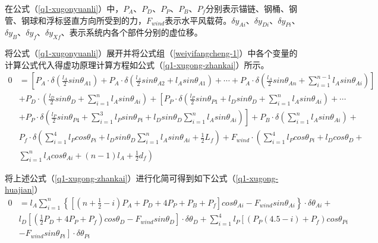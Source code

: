 \documentclass[withoutpreface,bwprint]{cumcmthesis} %
\begin{document}
\par 在公式（\ref{q1-xugonyuanli}）中，$P_A$、$P_D$、$P_P$、$P_B$、$P_f$分别表示锚链、钢桶、钢管、钢球和浮标竖直方向所受到的力，$F_{wind}$表示水平风载荷。$\delta y_{Ai}$、$\delta y_{Di}$、$\delta y_{Pi}$、$\delta y_{B}$、$\delta y_{f}$、$\delta y_{Xf}$、表示系统内各个部件分别的虚位移。
\par 将公式（\ref{q1-xugonyuanli}）展开并将公式组（\ref{weiyifangcheng-1}）中各个变量的计算公式代入得虚功原理计算方程如公式（\ref{q1-xugong-zhankai}）所示。
\begin{equation}
	\label{q1-xugong-zhankai}
	\begin{split}
		0 &= \left[ P_A \cdot \delta(\frac{l_A}{2}sin \theta_{A1}) + P_A \cdot \delta(\frac{l_A}{2}sin \theta_{A2} + l_A sin \theta_{A1}) + \cdots +P_A \cdot \delta(\frac{l_A}{2}sin \theta_{An} + \sum\limits_{i=1}^{n-1} l_A sin \theta_{Ai}) \right] \\ 
		& + P_D \cdot (\frac{l_D}{2}sin \theta_{D} + \sum\limits_{i=1}^{n}l_A sin \theta_{Ai}) + \left[ {P_P \cdot \delta(\frac{l_P}{2}sin \theta_{P1} + l_D sin \theta_D + \sum\limits_{i=1}^{n}l_A sin\theta_{Ai} ) + \cdots} \right. \\
		& \left. {+ P_P \cdot \delta(\frac{l_P}{2}sin \theta_{P4} + \sum\limits_{i=1}^{3} l_P sin \theta_{Pi} +l_D sin \theta_D \sum\limits_{i=1}^{n}l_A sin\theta_{Ai} )} \right] + P_B \cdot \delta (\sum\limits_{i=1}^{n} l_A sin \theta_{Ai}) + \\
		& P_f \cdot \delta (\sum\limits_{i=1}^{4}l_P cos\theta_{Pi} + l_D sin \theta_{D} \sum\limits_{i=1}^{n}l_A sin \theta_{Ai} + \frac{1}{2}L_f) + F_{wind} \cdot \left({\sum\limits_{i=1}^{4}l_P cos \theta_{Pi} + l_D cos \theta_D +} \right. \\
		& \left. {\sum\limits_{i=1}^{n}l_A cos \theta_{Ai} + (n-1)l_A + \frac{1}{2} d_f} \right)
	\end{split}
\end{equation}
\par 将上述公式（\ref{q1-xugong-zhankai}）进行化简可得到如下公式（\ref{q1-xugong-huajian}）
\begin{equation}
	\label{q1-xugong-huajian}
	\begin{split}
		0 &= l_A \sum\limits_{i=1}^{n} \left\{ { \left[(n+\frac{1}{2} - i)P_A +P_D +4P_P +P_B+P_f\right]cos \theta_{Ai} - F_{wind}sin\theta_{Ai} }\right\} \cdot \delta\theta_{Ai} + \\
		& l_D \left[ {(\frac{1}{2} P_D +4P_P+P_f)cos\theta_D - F_{wind}sin\theta_D }\right] \cdot \delta \theta_D  + \sum\limits_{i=1}^{4}l_P \left[ {(P_P(4.5-i)+P_f)cos\theta_{Pi}}\right.\\
		& \left. {-F_{wind} sin\theta_{Pi} }\right] \cdot \delta \theta_{Pi}
	\end{split}
\end{equation}
\end{document}
